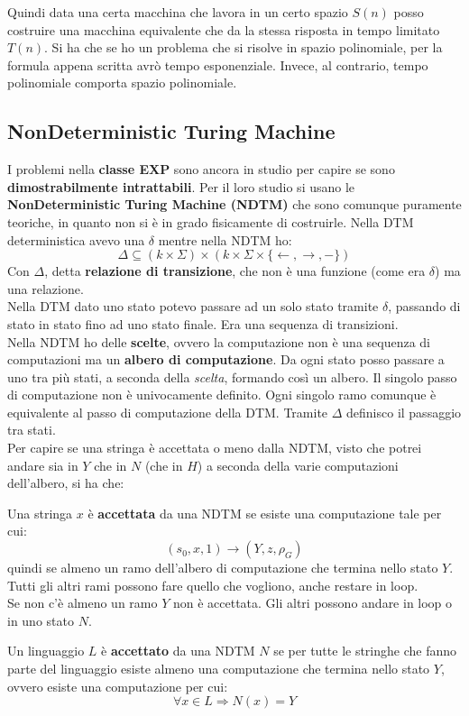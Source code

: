 \documentclass[a4paper,12pt, oneside]{book}
\begin{document}
Quindi data una certa macchina che lavora in un certo spazio $S(n)$ posso
costruire una macchina equivalente che da la stessa risposta in tempo limitato
$T(n)$. Si ha che se ho un problema che si risolve in spazio polinomiale, per
la formula appena scritta avrò tempo esponenziale. Invece, al contrario, tempo
polinomiale comporta spazio polinomiale.
\subsection{NonDeterministic Turing Machine}
I problemi nella \textbf{classe EXP} sono ancora in studio per capire se sono
\textbf{dimostrabilmente intrattabili}. Per il loro studio
si usano le \textbf{NonDeterministic Turing Machine (NDTM)} che sono comunque
puramente teoriche, in quanto non si è in grado fisicamente di costruirle. Nella
DTM deterministica avevo una $\delta$ mentre nella NDTM ho:
\[\Delta\subseteq (k\times \Sigma)\times (k\times \Sigma \times\{\leftarrow,
  \rightarrow, -\})\]
Con $\Delta$, detta \textbf{relazione di transizione}, che non è una funzione
(come era $\delta$) ma una relazione.\\ 
Nella DTM dato uno stato potevo passare ad un solo stato tramite $\delta$,
passando di stato in stato fino ad uno stato finale. Era una sequenza di
transizioni. \\
Nella NDTM ho delle \textbf{scelte}, ovvero la computazione non è una sequenza
di computazioni ma un \textbf{albero di computazione}. Da ogni stato posso
passare a uno tra più stati, a seconda della \textit{scelta}, formando così un
albero. Il singolo passo di computazione non è univocamente definito. Ogni
singolo ramo comunque è equivalente al passo di computazione della DTM. Tramite
$\Delta$ definisco il passaggio tra stati.\\
Per capire se una stringa è accettata o meno dalla NDTM, visto che potrei andare
sia in $Y$ che in $N$ (che in $H$) a seconda della varie computazioni
dell'albero, si ha che:
\begin{definizione}
  Una stringa $x$ è \textbf{accettata} da una NDTM se esiste una computazione
  tale per cui:
  \[(s_0,x,1)\to(Y, z, \rho_G)\]
  quindi se almeno un ramo dell'albero di computazione che termina nello stato
  $Y$. Tutti gli altri rami possono fare quello che vogliono, anche restare in
  loop.\\
  Se non c'è almeno un ramo $Y$ non è accettata. Gli altri possono andare in
  loop o in uno stato $N$.
\end{definizione}
\begin{definizione}
  Un linguaggio $L$ è \textbf{accettato} da una NDTM $N$ se per tutte le
  stringhe che fanno parte del linguaggio esiste almeno una computazione che
  termina nello stato $Y$, ovvero esiste una computazione per cui:
  \[\forall x\in L\Rightarrow N(x)=Y\]
\end{definizione}
\end{document}
